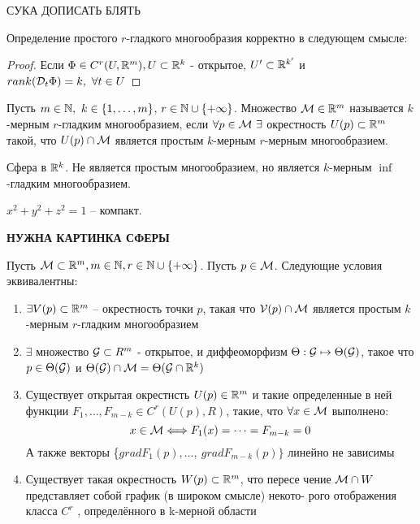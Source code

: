 СУКА ДОПИСАТЬ БЛЯТЬ

\begin{lemma}
    Определение простого $r$-гладкого многообразия корректно в следующем смысле:
\end{lemma}

\begin{proof}
    Если $\Phi \in C^r(U, \mathbb{R}^m), U \subset \mathbb{R}^k$ - открытое, $U'\subset \mathbb{R}^{k'}$ и $rank(\mathcal{D}_{t}\Phi) = k, \ \forall t \in U$
\end{proof}






















\begin{definition}
    Пусть $m \in \mathbb{N}, \ k \in \{ 1,\dots, m\}$, $r \in \mathbb{N} \cup \{+\infty \}$. Множество $\mathcal{M} \in \mathbb{R}^{m} $ называется $k$-мерным $r$-гладким многообразием, если $\forall p \in \M \ \exists$ окрестность $U(p) \subset \mathbb{R}^{m}$ такой, что $U(p) \cap \mathcal{M}$ является простым $k$-мерным $r$-мерным многообразием. 
\end{definition}

\begin{example}
    Сфера в $\mathbb{R}^{k}$. Не является простым многообразием, но является $k$-мерным $\inf$-гладким многообразием. 

    \noindent $x^2 + y^2 + z^2 = 1$ -- компакт.
    
    \textbf{НУЖНА КАРТИНКА СФЕРЫ}
\end{example}

\begin{theorem}
Пусть $\mathcal{M} \subset \mathbb{R}^m, m \in \mathbb{N}, r \in \mathbb{N} \cup \{+ \infty \}$. Пусть $p \in \mathcal{M}$.
Следующие условия эквивалентны: 
\begin{enumerate}
    \item $\exists V(p) \subset \mathbb{R}^m$ -- окрестность точки $p$, такая что $\mathcal{V}(p) \cap \mathcal{M}$ является простым $k$-мерным $r$-гладким многообразием 
    \item $\exists$ множество $\mathcal{G} \subset R^m$ - открытое, и диффеоморфизм $\Theta: \mathcal{G} \mapsto \Theta(\mathcal{G})$, такое что $p \in \Theta(\mathcal{G})$ и $\Theta(\mathcal{G}) \cap \mathcal{M} = \Theta(\mathcal{G} \cap \mathbb{R}^k)$
    \item Существует открытая окрестнсть $U(p) \in \mathbb{R}^m$ и такие определенные в ней функции $F_{1}, \dots , F_{m-k} \in C^{r}(U(p), R)$, такие, что $\forall x \in \mathcal{M}$ выполнено:
    $$x \in \mathcal{M} \Longleftrightarrow F_{1}(x) = \dots = F_{m-k} = 0$$
    А также векторы \{$grad F_1(p),\dots, \ grad F_{m-k}(p)\}$ линейно не зависимы
    \item Существует такая окрестность $W(p) \subset \mathbb{R}^m$, что пересе
чение $\mathcal{M} \cap W$ представляет собой график (в широком смысле) некото-
рого отображения класса $C^r$ , определённого в k-мерной области
\end{enumerate}
\end{theorem}

